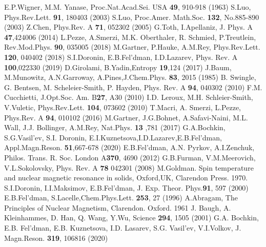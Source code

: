\documentclass[preprint,12pt]{elsarticle}
\begin{document}
\begin{thebibliography}{20}
   E.P.Wigner, M.M. Yanase, Proc.Nat.Acad.Sei. USA \textbf{49}, 910-918 (1963)
   S.Luo, Phys.Rev.Lett. \textbf{91}, 180403 (2003)
   S.Luo, Proc.Amer. Math.Soc. \textbf{132}, No.885-890 (2003)
   Z.Chen, Phys.Rev. A \textbf{71}, 052302 (2005)
   G.Toth, I.Apellaniz, J. Phys. A \textbf{47},424006 (2014)
   L.Pezze, A.Smerzi, M.K. Oberthaler, R. Schmied, P.Treutlein, Rev.Mod.Phys. \textbf{90}, 035005 (2018)
   M.Gartner, P.Hauke, A.M.Rey, Phys.Rev.Lett. \textbf{120}, 040402 (2018)
   S.I.Doronin, E.B.Fel'dman, I.D.Lazarev, Phys. Rev. A \textbf{100},022330 (2019)
   D.Girolami, B.Yadin,Entropy \textbf{19},124 (2017)
   J.Baum, M.Munowitz, A.N.Garroway, A.Pines,J.Chem.Phys. \textbf{83}, 2015 (1985)
   B. Swingle, G. Bentsen, M. Scheleier-Smith, P. Hayden, Phys.	Rev. A \textbf{94}, 040302 (2010)
   F.M. Cucchietti, J.Opt.Soc. Am. B\textbf{27}, A30 (2010)
   I.D. Leroux, M.H. Schleier-Smith, V.Vuletic, Phys.Rev.Lett. \textbf{104}, 073602 (2010)
   T.Macri, A. Smerzi, L.Pezze, Phys.Rev. A \textbf{94}, 010102 (2016)
   M.Gartner, J.G.Bohnet, A.Safavi-Naini, M.L. Wall, J.J. Bollinger, A.M.Rey, Nat.Phys. \textbf{13} ,781 (2017)
   G.A.Bochkin, S.G.Vasil'ev, S.I. Doronin, E.I.Kuznetsova,I.D.Lazarev,E.B.Fel'dman, Appl.Magn.Reson. \textbf{51},667-678 (2020)
   E.B.Fel'dman, A.N. Pyrkov, A.I.Zenchuk, Philos. Trans. R. Soc. London A\textbf{370}, 4690 (2012)
   G.B.Furman, V.M.Meerovich, V.L.Sokolovsky, Phys. Rev. A \textbf{78} 042301 (2008)
   M.Goldman. Spin temperature and nuclear magnetic resonance in solids, Oxford,UK, Clarendon Press. 1970.
   S.I.Doronin, I.I.Maksimov, E.B.Fel’dman, J. Exp. Theor. Phys.\textbf{91}, 597 (2000)
   E.B.Fel'dman, S.Lacelle,Chem.Phys.Lett. \textbf{253}, 27 (1996)
   A.Abragam, The Principles of Nuclear Magnetism, Clarendon. Oxford. 1961
   J. Baugh, A. Kleinhammes, D. Han, Q. Wang, Y.Wu, Science \textbf{294}, 1505 (2001)
   G.A. Bochkin, E.B. Fel'dman, E.B. Kuznetsova, I.D. Lasarev, S.G. Vasil'ev, V.I.Volkov, J. Magn.Reson. \textbf{319}, 106816 (2020)
\end{thebibliography}
\end{document}

